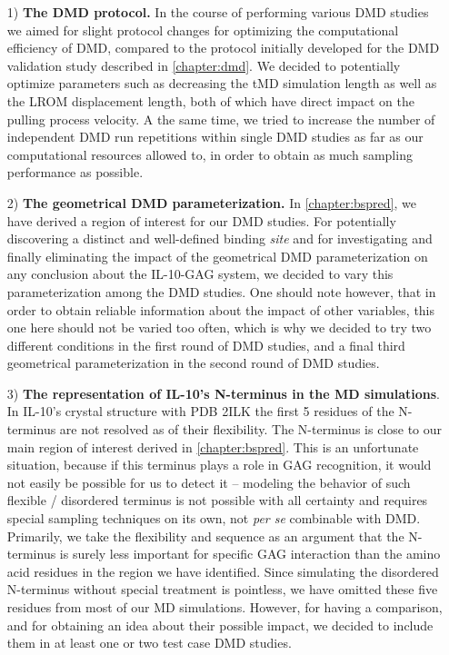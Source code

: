 \begin{itemize}

\item[1)] \textbf{The DMD protocol.} In the course of performing various DMD
studies we aimed for slight protocol changes for optimizing the computational
efficiency of DMD, compared to the protocol initially developed for the DMD
validation study described in \cref{chapter:dmd}. We decided to potentially
optimize parameters such as decreasing the tMD simulation length as well as the
LROM displacement length, both of which have direct impact on the pulling
process velocity. A the same time, we tried to increase the number of
independent DMD run repetitions within single DMD studies as far as our
computational resources allowed to, in order to obtain as much sampling
performance as possible.

\item[2)] \textbf{The geometrical DMD parameterization.} In
\cref{chapter:bspred}, we have derived a region of interest for our DMD studies.
For potentially discovering a distinct and well-defined binding \textit{site}
and for investigating and finally eliminating the impact of the geometrical DMD
parameterization on any conclusion about the IL-10-GAG system, we decided to
vary this parameterization among the DMD studies. One should note however, that
in order to obtain reliable information about the impact of other variables,
this one here should not be varied too often, which is why we decided to try two
different conditions in the first round of DMD studies, and a final third
geometrical parameterization in the second round of DMD studies.

\item[3)] \textbf{The representation of IL-10's N-terminus in the MD
simulations}. In IL-10's crystal structure with PDB 2ILK the first 5 residues of
the N-terminus are not resolved as of their flexibility. The N-terminus is close
to our main region of interest derived in \cref{chapter:bspred}. This is an
unfortunate situation, because if this terminus plays a role in GAG recognition,
it would not easily be possible for us to detect it -- modeling the behavior of
such flexible / disordered terminus is not possible with all certainty and
requires special sampling techniques on its own, not \textit{per se} combinable
with DMD. Primarily, we take the flexibility and sequence as an argument that
the N-terminus is surely less important for specific GAG interaction than the
amino acid residues in the region we have identified. Since simulating the
disordered N-terminus without special treatment is pointless, we have omitted
these five residues from most of our MD simulations. However, for having a
comparison, and for obtaining an idea about their possible impact, we decided to
include them in at least one or two test case DMD studies.


\end{itemize}
